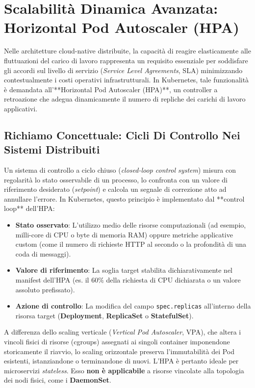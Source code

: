 \documentclass[11pt, a4paper]{article}
\begin{document}

\section{Scalabilità Dinamica Avanzata: Horizontal Pod Autoscaler (HPA)}

Nelle architetture cloud-native distribuite, la capacità di reagire elasticamente alle fluttuazioni del carico di lavoro rappresenta un requisito essenziale per soddisfare gli accordi sul livello di servizio (\emph{Service Level Agreements}, SLA) minimizzando contestualmente i costi operativi infrastrutturali. In Kubernetes, tale funzionalità è demandata all'**Horizontal Pod Autoscaler (HPA)**, un controller a retroazione che adegua dinamicamente il numero di repliche dei carichi di lavoro applicativi.

\subsection{Richiamo Concettuale: Cicli Di Controllo Nei Sistemi Distribuiti}
Un sistema di controllo a ciclo chiuso (\emph{closed-loop control system}) misura con regolarità lo stato osservabile di un processo, lo confronta con un valore di riferimento desiderato (\emph{setpoint}) e calcola un segnale di correzione atto ad annullare l'errore.
In Kubernetes, questo principio è implementato dal **control loop** dell'HPA:
\begin{itemize}[noitemsep]
    \item \textbf{Stato osservato}: L'utilizzo medio delle risorse computazionali (ad esempio, milli-core di CPU o byte di memoria RAM) oppure metriche applicative custom (come il numero di richieste HTTP al secondo o la profondità di una coda di messaggi).
    \item \textbf{Valore di riferimento}: La soglia target stabilita dichiarativamente nel manifest dell'HPA (es. il $60\%$ della richiesta di CPU dichiarata o un valore assoluto prefissato).
    \item \textbf{Azione di controllo}: La modifica del campo \texttt{spec.replicas} all'interno della risorsa target (\textbf{Deployment}, \textbf{ReplicaSet} o \textbf{StatefulSet}).
\end{itemize}

A differenza dello scaling verticale (\emph{Vertical Pod Autoscaler}, VPA), che altera i vincoli fisici di risorse (cgroups) assegnati ai singoli container imponendone storicamente il riavvio, lo scaling orizzontale preserva l'immutabilità dei Pod esistenti, istanziandone o terminandone di nuovi. L'HPA è pertanto ideale per microservizi \emph{stateless}. Esso \textbf{non è applicabile} a risorse vincolate alla topologia dei nodi fisici, come i \textbf{DaemonSet}.
\end{document}
